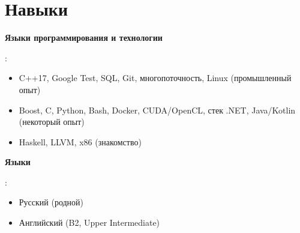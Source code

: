 \documentclass[letterpaper,10pt]{article}
\begin{document}
 \section{Навыки}
 \begin{itemize}[leftmargin=0.15in, label={}]
 	\small{\item{
 			\textbf{Языки программирования и технологии}{:
 				\begin{itemize}
 					\item C++17, Google Test, SQL, Git, многопоточность, Linux (промышленный опыт)
 					\item Boost, C, Python, Bash, Docker, CUDA/OpenCL, стек .NET, Java/Kotlin (некоторый опыт)
 					\item Haskell, LLVM, x86 (знакомство)
 				\end{itemize} }

 			\textbf{Языки}{:\\ 
 				\begin{itemize}
 					\item Русский (родной)
 					\item Английский (B2, Upper Intermediate)
 				\end{itemize}}
 	}}
 \end{itemize}
\end{document}
